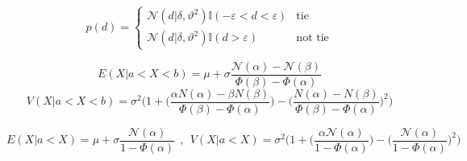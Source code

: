 \documentclass[article]{jss}
\newif\ifen
\newif\ifes
\newcommand{\en}[1]{\ifen#1\fi}
\newcommand{\es}[1]{\ifes#1\fi}
\newcommand{\N}{\mathcal{N}}
\begin{document}
%
\en{Remember that \texttt{teams}, \texttt{results}, and \texttt{p\_draw}, were defined in Code \ref{lst:game} and \ref{lst:draw}.}
\es{Recuerden que \texttt{teams}, \texttt{results}, y \texttt{p\_draw}, fueron definidas en los c\'odigos \ref{lst:game} y \ref{lst:draw}.}


\en{The need to approximate the posterior occurs because the probability distribution of the difference is a truncated Gasussian (Eq.~\ref{eq:p_d}).}
\es{La necesidad de aproximar el posterior ocurre debido a que la distribuci\'on de probabilidad de la diferencia es una Gasussian truncada (Eq.~\ref{eq:p_d}).}
%
\begin{equation}\label{eq:p_d}
p(d) =
\begin{cases}
\N(d|\delta,\vartheta^2) \mathbb{I}(-\varepsilon < d < \varepsilon) & \text{tie} \\
\N(d|\delta,\vartheta^2) \mathbb{I}(d > \varepsilon) & \text{not tie}
\end{cases}
\end{equation}
%
\en{For Gaussian distributions, moment matching is known to minimize the Kullback-Leibler divergence~\citep{Herbrich2007}.}
\es{Se sabe que las distribuciones gaussianas que minimizan la divergencia Kullback-Libler son las que tiene mismo momentos~\citep{Herbrich2007}.}
%
\en{The expectation and variance of a truncated Gaussian $\N(x|\mu,\sigma^2)$ in a $[a,b]$ interval are,}
\es{La esperanza y la varianza de una gaussiana truncada $\N(x|\mu,\sigma^2)$ en un intervalo $[a,b]$ son,}
%
\begin{equation}\label{eq:mean_aprox_double}
 E(X| a < X < b) = \mu + \sigma \frac{\N(\alpha) - \N(\beta) }{\Phi(\beta) - \Phi(\alpha) }
\end{equation}
%
\begin{equation}\label{eq:variance_aprox_double}
 V(X| a < X < b) = \sigma^2 \Bigg( 1 + \bigg(\frac{\alpha N(\alpha) - \beta N(\beta) }{\Phi(\beta) - \Phi(\alpha) }\bigg) - \bigg(\frac{N(\alpha) - N(\beta) }{\Phi(\beta) - \Phi(\alpha) }\bigg)^2 \Bigg)
\end{equation}
%
\en{where $\beta = \frac{b-\mu}{\sigma}$ and $\alpha = \frac{a-\mu}{\sigma}$.}
\es{donde $\beta = \frac{b-\mu}{\sigma}$ y $\alpha = \frac{a-\mu}{\sigma}$.}
%
\en{With a single-sided truncation, these functions can be simplified as,}
\es{Con un \'unico truncamiento, estas funciones se pueden simplificar como,}
%
\begin{equation*}
 E(X| a < X )   =  \mu + \sigma \frac{\N(\alpha)}{1 - \Phi(\alpha) } \ \ , \ \ V(X| a < X )  = \sigma^2 \Bigg( 1 + \bigg(\frac{\alpha \N(\alpha)}{1 - \Phi(\alpha) }\bigg) - \bigg(\frac{\N(\alpha)}{1 - \Phi(\alpha) }\bigg)^2 \Bigg) 
\end{equation*}
\end{document}
